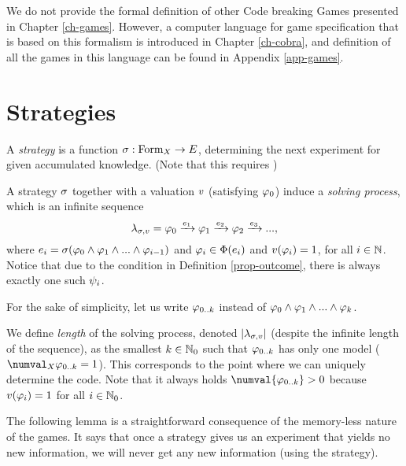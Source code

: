 We do not provide the formal definition of other Code breaking Games presented in
  Chapter \ref{ch-games}.
However, a computer language for game specification
  that is based on this formalism is introduced in Chapter \ref{ch-cobra}, and
  definition of all the games in this language can be found in Appendix \ref{app-games}.

\section{Strategies}

\begin{definition}
A \emph{strategy} is a function $\sigma: \textrm{Form}_X -> E$,
  determining the next experiment for given accumulated knowledge.
(Note that this requires )
\end{definition}

A strategy $\sigma$ together with a valuation $v$ (satisfying $\varphi_0$) induce
  a \emph{solving process}, which is an infinite sequence
\[
\lambda_{\sigma,v} = \varphi_0 \xrightarrow{e_1} \varphi_1 \xrightarrow{e_2}
  \varphi_2 \xrightarrow{e_3} ...,
\]
where $e_i = \sigma(\varphi_0 \wedge \varphi_1 \wedge ... \wedge \varphi_{i-1})$ and
$\varphi_i \in \Phi(e_i)$ and $v(\varphi_i) = 1$,
for all $i\in\mathbb{N}$. Notice that due to the condition in Definition \ref{prop-outcome},
there is always exactly one such $\psi_i$.

For the sake of simplicity, let us write $\varphi_{0..k}$
instead of $\varphi_0 \wedge \varphi_1 \wedge ... \wedge \varphi_k$.

We define \emph{length} of the solving process,
  denoted $|\lambda_{\sigma,v}|$
  (despite the infinite length of the sequence),
  as the smallest $k\in\mathbb{N}_0$ such that
  $\varphi_{0..k}$ has only one model ($\numval_\Var{\aform{k}} = 1$).
This corresponds to the point where we can uniquely
  determine the code.
Note that it always holds $\numval{\aform{k}} > 0$ because
  $v(\varphi_i) = 1$ for all $i\in\mathbb{N}_0$.

The following lemma is a straightforward consequence
  of the memory-less nature of the games. It says that once a strategy
  gives us an experiment that yields no new information, we will never get
  any new information (using the strategy).


